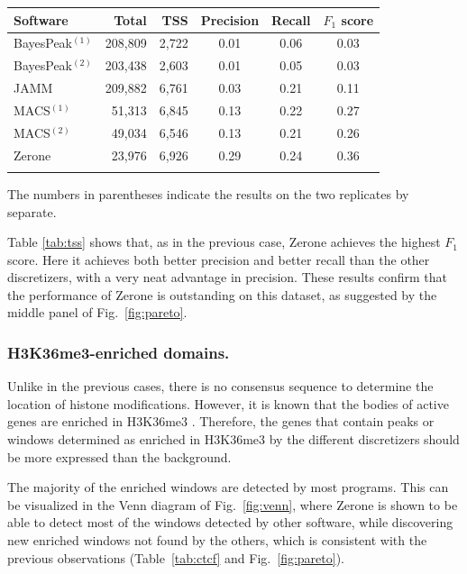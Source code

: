 \documentclass{bioinfo}
\begin{document}
\begin{table}[!t]
{\begin{tabular}{lrrccc}
        \toprule
        \textbf{Software}  & \textbf{Total}  & \textbf{TSS} &
        \textbf{Precision} & \textbf{Recall} & \textbf{$F_{1}$ score} \\
        \midrule
        BayesPeak$^{(1)}$ & 208,809 & 2,722 & 0.01 & 0.06 & 0.03 \\
        BayesPeak$^{(2)}$ & 203,438 & 2,603 & 0.01 & 0.05 & 0.03 \\
        JAMM              & 209,882 & 6,761 & 0.03 & 0.21 & 0.11 \\
        MACS$^{(1)}$      &  51,313 & 6,845 & 0.13 & 0.22 & 0.27 \\
        MACS$^{(2)}$      &  49,034 & 6,546 & 0.13 & 0.21 & 0.26 \\
        Zerone            &  23,976 & 6,926 & 0.29 & 0.24 & 0.36 \\
        \botrule
\end{tabular}}{The numbers in parentheses indicate the results on the two
replicates by separate.}
\end{table}

Table \ref{tab:tss} shows that, as in the previous case, Zerone
achieves the highest $F_1$ score. Here it achieves both better
precision and better recall than the other discretizers, with a
very neat advantage in precision. These results confirm that
the performance of Zerone is outstanding on this dataset, as suggested
by the middle panel of Fig.~\ref{fig:pareto}.

\subsubsection{H3K36me3-enriched domains.}
Unlike in the previous cases, there is no consensus sequence
to determine the location of histone modifications. However, it is
known that the bodies of active genes are enriched in H3K36me3
\citep{pmid16122420,pmid23739122}. Therefore, the genes that contain
peaks or windows determined as enriched in H3K36me3 by the different
discretizers should be more expressed than the background.

The majority of the enriched windows are detected by most programs.
This can be visualized in the Venn diagram of Fig.~\ref{fig:venn},
where Zerone is shown to be able to detect most of the windows detected
by other software, while discovering new enriched windows not found by
the others, which is consistent with the previous observations
(Table~\ref{tab:ctcf} and Fig.~\ref{fig:pareto}).
\end{document}
